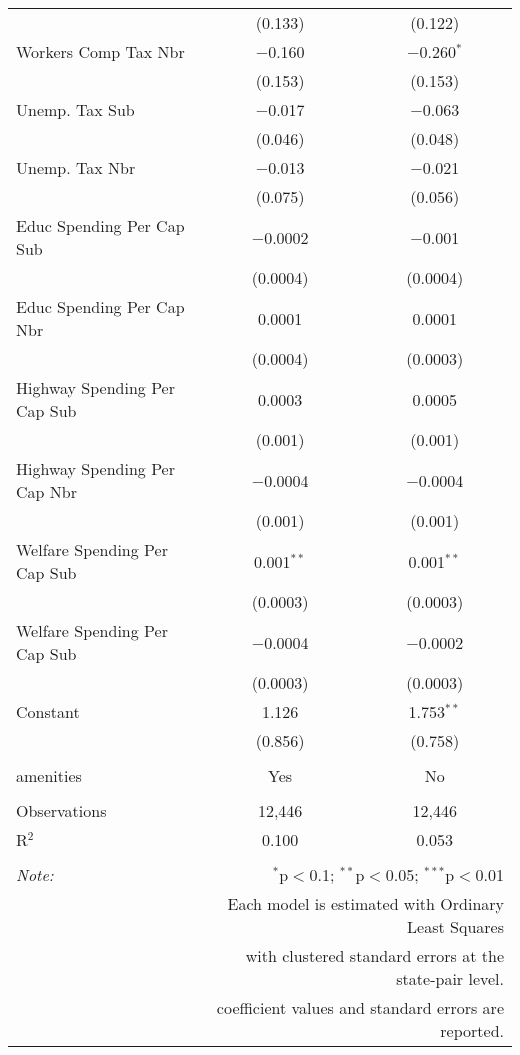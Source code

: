 \begin{table}[!htbp]
\begin{tabular}{@{\extracolsep{5pt}}lcc}
  & (0.133) & (0.122) \\ 
  Workers Comp Tax Nbr & $-$0.160 & $-$0.260$^{*}$ \\ 
  & (0.153) & (0.153) \\ 
  Unemp. Tax Sub & $-$0.017 & $-$0.063 \\ 
  & (0.046) & (0.048) \\ 
  Unemp. Tax Nbr & $-$0.013 & $-$0.021 \\ 
  & (0.075) & (0.056) \\ 
  Educ Spending Per Cap Sub & $-$0.0002 & $-$0.001 \\ 
  & (0.0004) & (0.0004) \\ 
  Educ Spending Per Cap Nbr & 0.0001 & 0.0001 \\ 
  & (0.0004) & (0.0003) \\ 
  Highway Spending Per Cap Sub & 0.0003 & 0.0005 \\ 
  & (0.001) & (0.001) \\ 
  Highway Spending Per Cap Nbr & $-$0.0004 & $-$0.0004 \\ 
  & (0.001) & (0.001) \\ 
  Welfare Spending Per Cap Sub & 0.001$^{**}$ & 0.001$^{**}$ \\ 
  & (0.0003) & (0.0003) \\ 
  Welfare Spending Per Cap Sub & $-$0.0004 & $-$0.0002 \\ 
  & (0.0003) & (0.0003) \\ 
  Constant & 1.126 & 1.753$^{**}$ \\ 
  & (0.856) & (0.758) \\ 
 \hline \\[-1.8ex] 
amenities & Yes & No \\ 
\hline \\[-1.8ex] 
Observations & 12,446 & 12,446 \\ 
R$^{2}$ & 0.100 & 0.053 \\ 
\hline 
\hline \\[-1.8ex] 
\textit{Note:}  & \multicolumn{2}{r}{$^{*}$p$<$0.1; $^{**}$p$<$0.05; $^{***}$p$<$0.01} \\ 
 & \multicolumn{2}{r}{Each model is estimated with Ordinary Least Squares} \\ 
 & \multicolumn{2}{r}{with clustered standard errors at the state-pair level.} \\ 
 & \multicolumn{2}{r}{coefficient values and standard errors are reported.} \\ 
\end{tabular} 
\end{table} 
